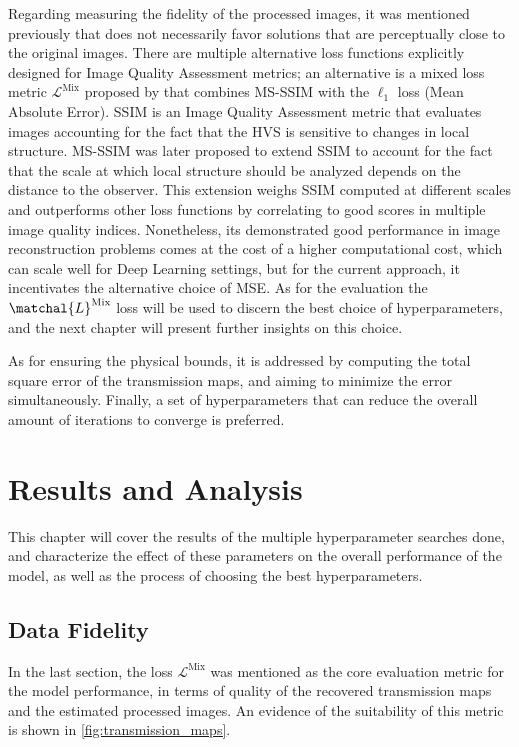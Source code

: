 \documentclass[nomenclature, english, bibtex]{kththesis}
\numberwithin{listing}{chapter}
\begin{document}
Regarding measuring the fidelity of the processed images, it was mentioned previously that  does not necessarily favor
solutions that are perceptually close to the original images. There are multiple alternative loss functions explicitly designed for
Image Quality Assessment metrics; an alternative is a mixed loss metric $\mathcal{L}^\text{Mix}$ proposed by \cite{zhaoLossFunctionsImage2017} that combines
\acrfull{MS-SSIM} with the $\ell_1$ loss (Mean Absolute Error). \acrshort{SSIM} is an Image Quality Assessment
metric that evaluates images accounting for the fact that the \acrfull{HVS} is sensitive to changes in local
structure. \acrshort{MS-SSIM} was later proposed to extend \acrshort{SSIM} to account for the fact that the
scale at which local structure should be analyzed depends on the distance to the observer. This extension
weighs \acrshort{SSIM} computed at different scales and outperforms other loss functions by correlating to good scores
in multiple image quality indices. Nonetheless, its demonstrated good performance in image reconstruction problems comes
at the cost of a higher computational cost, which can scale well for Deep Learning settings, but for the current
approach, it incentivates the alternative choice of \acrshort{MSE}. As for the evaluation the $\matchal{L}^{\text{Mix}}$ loss
will be used to discern the best choice of hyperparameters, and the next chapter will present further insights on this choice.

As for ensuring the physical bounds, it is addressed by computing the total square error of the transmission maps,
and aiming to minimize the error simultaneously. Finally, a set of hyperparameters that can reduce the overall amount of
iterations to converge is preferred.


\chapter{Results and Analysis}
\label{ch:resultsAndAnalysis}

This chapter will cover the results of the multiple hyperparameter searches done, and characterize the effect of
these parameters on the overall performance of the model, as well as the process of choosing the best hyperparameters.

\section{Data Fidelity}

In the last section, the loss $\mathcal{L}^{\text{Mix}}$ was mentioned as the core evaluation metric for the model performance,
in terms of quality of the recovered transmission maps and the estimated processed images. An evidence of the suitability
of this metric is shown in \autoref{fig:transmission_maps}.
\end{document}
